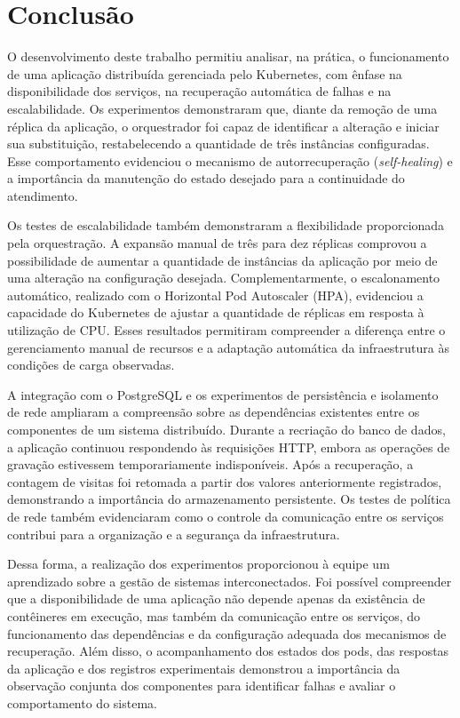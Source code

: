 \FloatBarrier\section{Conclusão}


O desenvolvimento deste trabalho permitiu analisar, na prática, o funcionamento de uma aplicação distribuída gerenciada pelo Kubernetes, com ênfase na disponibilidade dos serviços, na recuperação automática de falhas e na escalabilidade. Os experimentos demonstraram que, diante da remoção de uma réplica da aplicação, o orquestrador foi capaz de identificar a alteração e iniciar sua substituição, restabelecendo a quantidade de três instâncias configuradas. Esse comportamento evidenciou o mecanismo de autorrecuperação (\textit{self-healing}) e a importância da manutenção do estado desejado para a continuidade do atendimento.

Os testes de escalabilidade também demonstraram a flexibilidade proporcionada pela orquestração. A expansão manual de três para dez réplicas comprovou a possibilidade de aumentar a quantidade de instâncias da aplicação por meio de uma alteração na configuração desejada. Complementarmente, o escalonamento automático, realizado com o Horizontal Pod Autoscaler (HPA), evidenciou a capacidade do Kubernetes de ajustar a quantidade de réplicas em resposta à utilização de CPU. Esses resultados permitiram compreender a diferença entre o gerenciamento manual de recursos e a adaptação automática da infraestrutura às condições de carga observadas.

A integração com o PostgreSQL e os experimentos de persistência e isolamento de rede ampliaram a compreensão sobre as dependências existentes entre os componentes de um sistema distribuído. Durante a recriação do banco de dados, a aplicação continuou respondendo às requisições HTTP, embora as operações de gravação estivessem temporariamente indisponíveis. Após a recuperação, a contagem de visitas foi retomada a partir dos valores anteriormente registrados, demonstrando a importância do armazenamento persistente. Os testes de política de rede também evidenciaram como o controle da comunicação entre os serviços contribui para a organização e a segurança da infraestrutura.

Dessa forma, a realização dos experimentos proporcionou à equipe um aprendizado sobre a gestão de sistemas interconectados. Foi possível compreender que a disponibilidade de uma aplicação não depende apenas da existência de contêineres em execução, mas também da comunicação entre os serviços, do funcionamento das dependências e da configuração adequada dos mecanismos de recuperação. Além disso, o acompanhamento dos estados dos pods, das respostas da aplicação e dos registros experimentais demonstrou a importância da observação conjunta dos componentes para identificar falhas e avaliar o comportamento do sistema.

